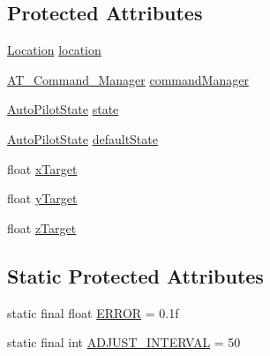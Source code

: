 \subsection*{Protected Attributes}
\begin{DoxyCompactItemize}
\item 
\hyperlink{class_drone_1_1_drone_controller_1_1_location}{Location} \hyperlink{class_drone_1_1_drone_controller_1_1_auto_pilot_1_1_auto_pilot_a9f7d264edde289a4d1f6ed70915fcbe1}{location}
\item 
\hyperlink{class_drone_1_1_drone_commands_1_1_a_t___command___manager}{A\+T\+\_\+\+Command\+\_\+\+Manager} \hyperlink{class_drone_1_1_drone_controller_1_1_auto_pilot_1_1_auto_pilot_a7368a23d40f51be57aa4506ee2e6ea16}{command\+Manager}
\item 
\hyperlink{interface_drone_1_1_drone_controller_1_1_auto_pilot_1_1_auto_pilot_state}{Auto\+Pilot\+State} \hyperlink{class_drone_1_1_drone_controller_1_1_auto_pilot_1_1_auto_pilot_aeddcac2f0c541e42b2d1034e7d2c6ea0}{state}
\item 
\hyperlink{interface_drone_1_1_drone_controller_1_1_auto_pilot_1_1_auto_pilot_state}{Auto\+Pilot\+State} \hyperlink{class_drone_1_1_drone_controller_1_1_auto_pilot_1_1_auto_pilot_ade2467dd822e41b4543f86a5298184d7}{default\+State}
\item 
float \hyperlink{class_drone_1_1_drone_controller_1_1_auto_pilot_1_1_auto_pilot_a7dac3f41e1f2053306c9f1ee1f52f4d3}{x\+Target}
\item 
float \hyperlink{class_drone_1_1_drone_controller_1_1_auto_pilot_1_1_auto_pilot_a2b12dc818a6868850498f3626bdfd62f}{y\+Target}
\item 
float \hyperlink{class_drone_1_1_drone_controller_1_1_auto_pilot_1_1_auto_pilot_a35b8ee5b8a76195dcb7804ec2d6e9f8f}{z\+Target}
\end{DoxyCompactItemize}
\subsection*{Static Protected Attributes}
\begin{DoxyCompactItemize}
\item 
static final float \hyperlink{class_drone_1_1_drone_controller_1_1_auto_pilot_1_1_auto_pilot_ae04d86839b6b6e571c1919dcc1910b07}{E\+R\+R\+O\+R} = 0.\+1f
\item 
static final int \hyperlink{class_drone_1_1_drone_controller_1_1_auto_pilot_1_1_auto_pilot_a07ecba3a82d5a8c611c15c62db622622}{A\+D\+J\+U\+S\+T\+\_\+\+I\+N\+T\+E\+R\+V\+A\+L} = 50
\end{DoxyCompactItemize}


